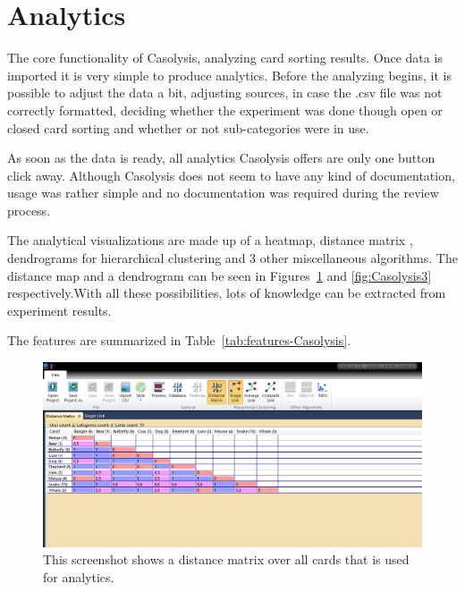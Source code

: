\section{Analytics}
The core functionality of Casolysis, analyzing card sorting results.
Once data is imported it is very simple to produce analytics. Before
the analyzing begins, it is possible to adjust the data a bit, adjusting
sources, in case the .csv file was not correctly formatted, deciding
whether the experiment was done though open or closed card sorting and
whether or not sub-categories were in use.

As soon as the data is ready, all analytics Casolysis offers are only
one button click away. Although Casolysis does not seem to have any 
kind of documentation, usage was rather simple and no documentation was
required during the review process.

The analytical visualizations are made up of a heatmap, distance
matrix , dendrograms for hierarchical clustering and 3 other
miscellaneous  algorithms. The distance map and a dendrogram can be
seen in Figures~\ref{fig:Casolysis2} and \ref{fig:Casolysis3}
respectively.With all these possibilities, lots of knowledge can be
extracted from experiment results.

The features are summarized in Table~\ref{tab:features-Casolysis}.

\begin{figure}[tp] 
\centering
\includegraphics[keepaspectratio,width=\linewidth,height=\halfh]{images/casolysis-diagram-1.png}
\caption[Casolysis Distance Matrix] { This screenshot shows a distance
matrix over all cards that is used for analytics.
 }
\label{fig:Casolysis2}
\end{figure}

